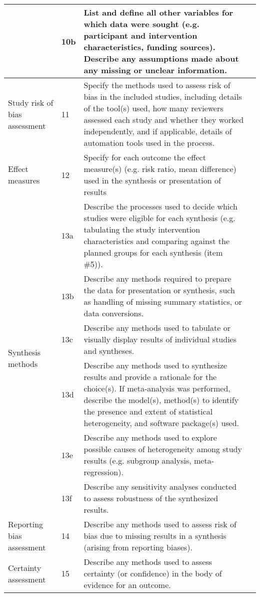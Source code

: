 \documentclass[landscape]{article}
\begin{document}
\begin{longtable}{|p{2.5cm}|p{0.5cm}|p{18cm}|p{3cm}|}
    \cline{2-4}
    & 10b & List and define all other variables for which data were sought (e.g. participant and intervention characteristics, funding sources). Describe any assumptions made about any missing or unclear information. & \\
    \hline
    Study risk of bias assessment &11  & Specify the methods used to assess risk of bias in the included studies, including details of the tool(s) used, how many reviewers assessed each study and whether they worked independently, and if applicable, details of automation tools used in the process. & \\
    \hline
    Effect measures  &  12 & Specify for each outcome the effect measure(s) (e.g. risk ratio, mean difference) used in the synthesis or presentation of results & \\
    \hline
    \multirow{6}{2.5cm}{Synthesis methods} & 13a & Describe the processes used to decide which studies were eligible for each synthesis (e.g. tabulating the study intervention characteristics and comparing against the planned groups for each synthesis (item \#5)). & \\
    \cline{2-4}
    & 13b & Describe any methods required to prepare the data for presentation or synthesis, such as handling of missing summary statistics, or data conversions. & \\
    \cline{2-4}
    & 13c & Describe any methods used to tabulate or visually display results of individual studies and syntheses. & \\
    \cline{2-4}
    & 13d & Describe any methods used to synthesize results and provide a rationale for the choice(s). If meta-analysis was performed, describe the model(s), method(s) to identify the presence and extent of statistical heterogeneity, and software package(s) used. & \\
    \cline{2-4}
    & 13e & Describe any methods used to explore possible causes of heterogeneity among study results (e.g. subgroup analysis, meta-regression).  & \\
    \cline{2-4}
    & 13f & Describe any sensitivity analyses conducted to assess robustness of the synthesized results.  & \\
    \hline
    Reporting bias assessment & 14 & Describe any methods used to assess risk of bias due to missing results in a synthesis (arising from reporting biases). & \\
    \hline
    Certainty assessment & 15 & Describe any methods used to assess certainty (or confidence) in the body of evidence for an outcome. & \\

\end{longtable}
\end{document}
